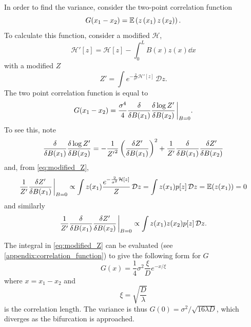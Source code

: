In order to find the variance, consider the two-point correlation function
\begin{equation}
  \label{eq:two_point_corr}
  G(x_1 - x_2) = \operatorname*{\mathbb{E}} \left(z\left(x_1\right)z\left(x_2\right)\right).
\end{equation}
To calculate this function, consider a modified $\mathcal{H}$,
\begin{equation}
  \label{eq:modified_H}
  \mathcal{H}'[z] = \mathcal{H}[z] - \int_0^L B(x) z(x) \dd{x}
\end{equation}
with a modified $Z$
\begin{equation}
  \label{eq:modified_Z}
  Z' = \int e^{-\frac{2}{\sigma^2} \mathcal{H}'[z]}\,\mathcal{D}z.
\end{equation}
The two point correlation function is equal \parencite{Goldenfeld1992} to
\begin{equation}
  \label{eq:two_point_from_partition}
  G(x_1-x_2) = \frac{\sigma^4}{4}\fdv{B(x_1)}\fdv{\log Z'}{B(x_2)} \eval_{B=0}.
\end{equation}
To see this, note
\begin{equation}
  \label{eq:log_deriv}
  \fdv{B(x_1)}\fdv{\log Z'}{B(x_2)} =  -\frac{1}{{Z'}^2}\left(\fdv{Z'}{B(x_1)}\right)^2 + \frac{1}{Z'}\fdv{B(x_1)}\fdv{Z'}{B(x_2)}
\end{equation}
and, from \cref{eq:modified_Z},
\begin{equation}
  \label{eq:log_deriv_first}
  \frac{1}{Z'}\fdv{Z'}{B(x_1)}\eval_{B=0} \propto \int z(x_1) \frac{e^{-\frac{2}{\sigma^2} \mathcal{H}[z]}}{Z}\,\mathcal{D}z = \int z(x_1) p[z] \,\mathcal{D}z = \E(z(x_1)) = 0
\end{equation}
and similarly
\begin{equation}
  \label{eq:log_deriv_second}
  \frac{1}{Z'}\fdv{B(x_1)}\fdv{Z'}{B(x_2)}\eval_{B=0} \propto \int z(x_1)z(x_2) p[z]\,\mathcal{D}z .
\end{equation}

The integral in \cref{eq:modified_Z} can be evaluated (see \cref{appendix:correlation_function}) to give the following form for $G$
\begin{equation}
  \label{eq:two_point_correlation_actual}
  G(x) = \frac{1}{4} \sigma^2 \frac{\xi}{D} e^{-x/\xi}
\end{equation}
where $x = x_1 - x_2$ and
\begin{equation}
  \label{eq:corr_len}
  \xi = \sqrt{\frac{D}{\lambda}}
\end{equation}
is the correlation length. The variance is thus $G(0) = \sigma^2/\sqrt{16\lambda D}$, which diverges as the bifurcation is approached.
